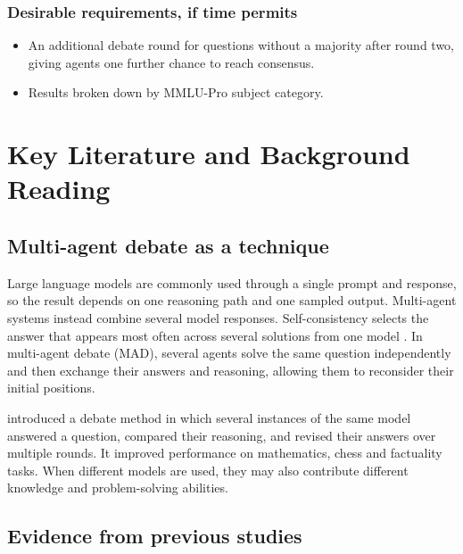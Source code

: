 \documentclass[12pt,a4paper]{article}
\begin{document}
\subsubsection*{Desirable requirements, if time permits}

\begin{itemize}
    \item An additional debate round for questions without a majority after
    round two, giving agents one further chance to reach consensus.

    \item Results broken down by MMLU-Pro subject category.
\end{itemize}


\section{Key Literature and Background Reading}

\subsection{Multi-agent debate as a technique}

Large language models are commonly used through a single prompt and response,
so the result depends on one reasoning path and one sampled output. Multi-agent
systems instead combine several model responses. Self-consistency selects the
answer that appears most often across several solutions from one model
\citep{wang2023selfconsistency}. In multi-agent debate (MAD), several agents
solve the same question independently and then exchange their answers and
reasoning, allowing them to reconsider their initial positions.

\citet{du2024multiagent} introduced a debate method in which several instances
of the same model answered a question, compared their reasoning, and revised
their answers over multiple rounds. It improved performance on mathematics,
chess and factuality tasks. When different models are used, they may also
contribute different knowledge and problem-solving abilities.

\subsection{Evidence from previous studies}
\end{document}
